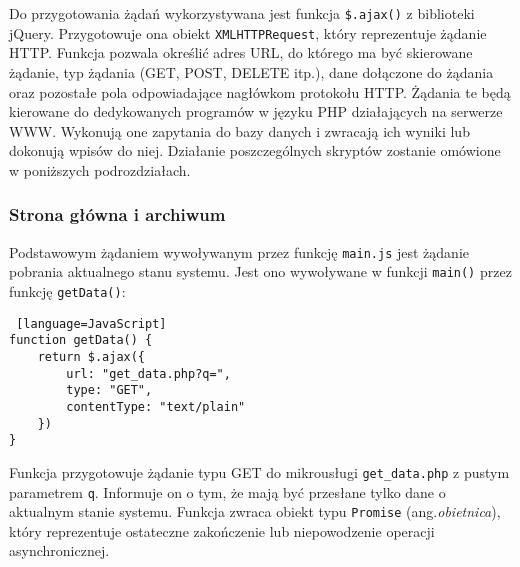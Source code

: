 \documentclass[a4paper,11pt,twoside]{article}
\begin{document}
Do przygotowania żądań wykorzystywana jest funkcja \texttt{\$.ajax()} z biblioteki jQuery. Przygotowuje ona obiekt \texttt{XMLHTTPRequest}, który reprezentuje żądanie HTTP. Funkcja pozwala określić adres URL, do którego ma być skierowane żądanie, typ żądania (GET, POST, DELETE itp.), dane dołączone do żądania oraz pozostałe pola odpowiadające nagłówkom protokołu HTTP. Żądania te będą kierowane do dedykowanych programów w języku PHP działających na serwerze WWW. Wykonują one zapytania do bazy danych i zwracają ich wyniki lub dokonują wpisów do niej. Działanie poszczególnych skryptów zostanie omówione w poniższych podrozdziałach.

\subsubsection{Strona główna i archiwum}
Podstawowym żądaniem wywoływanym przez funkcję \texttt{main.js} jest żądanie pobrania aktualnego stanu systemu. Jest ono wywoływane w funkcji \texttt{main()} przez funkcję \texttt{getData()}:
\begin{lstlisting} [language=JavaScript]
function getData() {
    return $.ajax({
        url: "get_data.php?q=",
        type: "GET",
        contentType: "text/plain"
    })
}
\end{lstlisting}
Funkcja przygotowuje żądanie typu GET do mikrousługi \texttt{get{\_}data.php} z pustym parametrem \texttt{q}. Informuje on o tym, że mają być przesłane tylko dane o aktualnym stanie systemu. Funkcja zwraca obiekt typu \texttt{Promise} (ang.\textit{obietnica}), który reprezentuje ostateczne zakończenie lub niepowodzenie operacji asynchronicznej.\cite{promise} 
\end{document}
